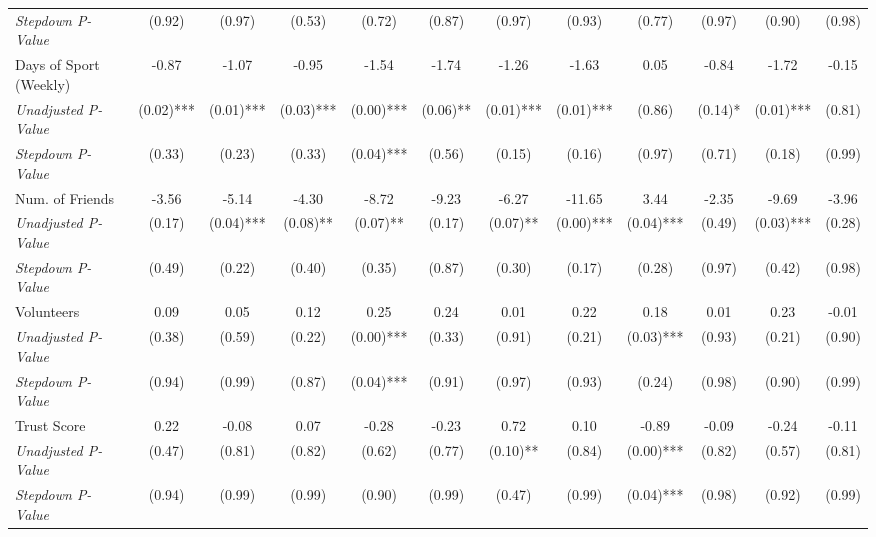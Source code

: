 \begin{tabular}{l c c c c c c c c c c c}
\quad \textit{Stepdown P-Value} & (0.92) & (0.97) & (0.53) & (0.72) & (0.87) & (0.97) & (0.93) & (0.77) & (0.97) & (0.90) & (0.98) \\
Days of Sport (Weekly) & -0.87 & -1.07 & -0.95 & -1.54 & -1.74 & -1.26 & -1.63 & 0.05 & -0.84 & -1.72 & -0.15 \\
\quad \textit{Unadjusted P-Value} & (0.02)*** & (0.01)*** & (0.03)*** & (0.00)*** & (0.06)** & (0.01)*** & (0.01)*** & (0.86) & (0.14)* & (0.01)*** & (0.81) \\
\quad \textit{Stepdown P-Value} & (0.33) & (0.23) & (0.33) & (0.04)*** & (0.56) & (0.15) & (0.16) & (0.97) & (0.71) & (0.18) & (0.99) \\
Num. of Friends & -3.56 & -5.14 & -4.30 & -8.72 & -9.23 & -6.27 & -11.65 & 3.44 & -2.35 & -9.69 & -3.96 \\
\quad \textit{Unadjusted P-Value} & (0.17) & (0.04)*** & (0.08)** & (0.07)** & (0.17) & (0.07)** & (0.00)*** & (0.04)*** & (0.49) & (0.03)*** & (0.28) \\
\quad \textit{Stepdown P-Value} & (0.49) & (0.22) & (0.40) & (0.35) & (0.87) & (0.30) & (0.17) & (0.28) & (0.97) & (0.42) & (0.98) \\
Volunteers & 0.09 & 0.05 & 0.12 & 0.25 & 0.24 & 0.01 & 0.22 & 0.18 & 0.01 & 0.23 & -0.01 \\
\quad \textit{Unadjusted P-Value} & (0.38) & (0.59) & (0.22) & (0.00)*** & (0.33) & (0.91) & (0.21) & (0.03)*** & (0.93) & (0.21) & (0.90) \\
\quad \textit{Stepdown P-Value} & (0.94) & (0.99) & (0.87) & (0.04)*** & (0.91) & (0.97) & (0.93) & (0.24) & (0.98) & (0.90) & (0.99) \\
Trust Score & 0.22 & -0.08 & 0.07 & -0.28 & -0.23 & 0.72 & 0.10 & -0.89 & -0.09 & -0.24 & -0.11 \\
\quad \textit{Unadjusted P-Value} & (0.47) & (0.81) & (0.82) & (0.62) & (0.77) & (0.10)** & (0.84) & (0.00)*** & (0.82) & (0.57) & (0.81) \\
\quad \textit{Stepdown P-Value} & (0.94) & (0.99) & (0.99) & (0.90) & (0.99) & (0.47) & (0.99) & (0.04)*** & (0.98) & (0.92) & (0.99) \\
\bottomrule
\end{tabular}
